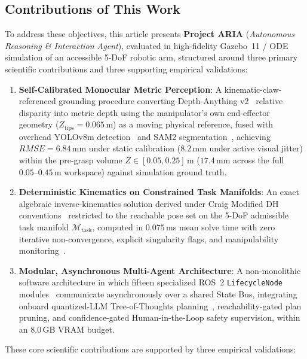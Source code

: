 \documentclass[journal]{IEEEtran}
\begin{document}
\subsection{Contributions of This Work}
To address these objectives, this article presents \textbf{Project ARIA} (\textit{Autonomous Reasoning \& Interaction Agent}), evaluated in high-fidelity Gazebo~11 / ODE simulation of an accessible 5-DoF robotic arm, structured around three primary scientific contributions and three supporting empirical validations:
\begin{enumerate}
    \item \textbf{Self-Calibrated Monocular Metric Perception}: A kinematic-claw-referenced grounding procedure converting Depth-Anything v2~\cite{aria_052_yang_2024_depth} relative disparity into metric depth using the manipulator's own end-effector geometry ($Z_{\text{tips}} = 0.065$\,m) as a moving physical reference, fused with overhead YOLOv8m detection~\cite{yolov8_2023} and SAM2 segmentation~\cite{aria_023_ravi_2024_sam}, achieving $RMSE = 6.84$\,mm under static calibration ($8.2$\,mm under active visual jitter) within the pre-grasp volume $Z \in [0.05, 0.25]$\,m ($17.4$\,mm across the full $0.05\text{--}0.45$\,m workspace) against simulation ground truth.
    \item \textbf{Deterministic Kinematics on Constrained Task Manifolds}: An exact algebraic inverse-kinematics solution derived under Craig Modified DH conventions~\cite{craig2005introduction} restricted to the reachable pose set on the 5-DoF admissible task manifold $\mathcal{M}_{\text{task}}$, computed in $0.075$\,ms mean solve time with zero iterative non-convergence, explicit singularity flags, and manipulability monitoring~\cite{yoshikawa1985manipulability}.
    \item \textbf{Modular, Asynchronous Multi-Agent Architecture}: A non-monolithic software architecture in which fifteen specialized ROS~2 \texttt{LifecycleNode} modules~\cite{aria_022_macenski_2022_robot} communicate asynchronously over a shared State Bus, integrating onboard quantized-LLM Tree-of-Thoughts planning~\cite{aria_132_yao_2023_tree}, reachability-gated plan pruning, and confidence-gated Human-in-the-Loop safety supervision, within an 8.0\,GB VRAM budget.
\end{enumerate}
These core scientific contributions are supported by three empirical validations:
\end{document}
